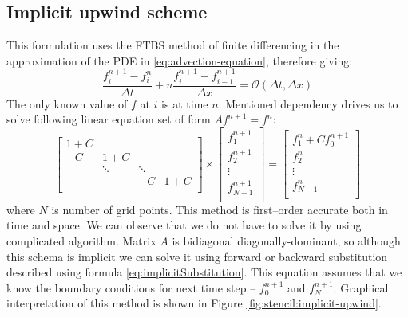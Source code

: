 \subsection{Implicit upwind scheme} \label{s:general-approach:implicit-upwind-analysis}
	This formulation uses the \gls{FTBS} method of finite differencing in the approximation of the \gls{PDE} in \eqref{eq:advection-equation}, therefore giving:
	\begin{equation} \label{eq:implicitUpwind_first}
		\frac{f_i^{n+1} - f_i^n}{\Delta t} + u\frac{f_i^{n+1} - f_{i-1}^{n+1}}{\Delta x} = \mathcal{O}(\Delta t, \Delta x)
	\end{equation}
	The only known value of $f$ at $i$ is at time $n$. Mentioned dependency drives us to solve following linear equation set of form $Af^{n+1} = f^n$:		
	\begin{equation}
		\begin{bmatrix}
			1+C & & & \\
			-C & 1+C & & \\ 
			& \ddots & \ddots \\
			& & -C & 1+C \\					
		\end{bmatrix} 
		\times
		\begin{bmatrix}
			f_1^{n+1} \\
			f_2^{n+1} \\
			\vdots	\\
			f_{N-1}^{n+1}\\
		\end{bmatrix}
		=
		\begin{bmatrix}
			f_1^{n} + C f_0^{n+1}\\
			f_2^{n} \\
			\vdots	\\
			f_{N-1}^{n}\\
		\end{bmatrix}
	\end{equation} 			
	where $N$ is number of grid points.
	This method is first--order accurate both in time and space. We can observe that we do not have to solve it by using complicated algorithm. Matrix $A$ is bidiagonal diagonally-dominant, so although this schema is implicit we can solve it using forward or backward substitution described using formula \eqref{eq:implicitSubstitution}. This equation assumes that we know the boundary conditions for next time step -- $f_0^{n+1}$ and $f_N^{n+1}$.  Graphical interpretation of this method is shown in Figure \ref{fig:stencil:implicit-upwind}.

